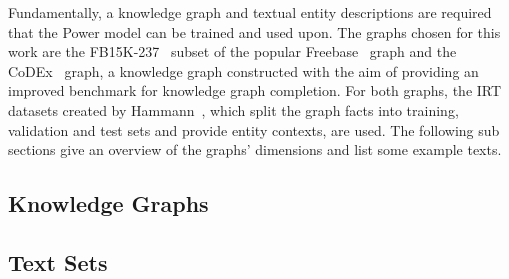 Fundamentally, a knowledge graph and textual entity descriptions are required that the Power model can be trained and used upon. The graphs chosen for this work are the FB15K-237~\cite{Toutanova2015ObservedVL} subset of the popular Freebase~\cite{Bollacker2008FreebaseAC} graph and the CoDEx~\cite{Safavi2020CoDExAC} graph, a knowledge graph constructed with the aim of providing an improved benchmark for knowledge graph completion. For both graphs, the IRT datasets created by Hammann~\cite{}, which split the graph facts into training, validation and test sets and provide entity contexts, are used. The following sub sections give an overview of the graphs' dimensions and list some example texts.

\subsection{Knowledge Graphs}
\label{subsec:5_experiments/1_base_datasets/1_knowledge_graphs}


\subsection{Text Sets}
\label{subsec:5_experiments/1_base_datasets/2_text_sets}

